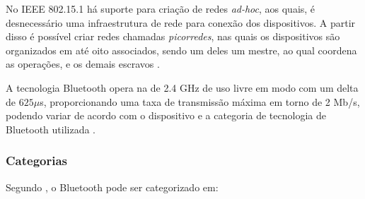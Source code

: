 
No IEEE 802.15.1 há suporte para criação de redes \textit{ad-hoc}, aos quais, é desnecessário uma infraestrutura de rede para conexão dos dispositivos. A partir disso é possível criar redes chamadas \textit{picorredes}, nas quais os dispositivos são organizados em até oito associados, sendo um deles um mestre, ao qual coordena as operações, e os demais escravos \cite{BluetoothSIG2017}.

A tecnologia Bluetooth opera na  de 2.4 GHz de uso livre em modo  com um delta de $625\mu$s, proporcionando uma taxa de transmissão máxima em torno de 2 Mb/s, podendo variar de acordo com o dispositivo e a categoria de tecnologia de Bluetooth utilizada \cite{BluetoothSIG2017}.


\subsubsection{Categorias}

Segundo \citeauthor{BluetoothSIG2017}, o Bluetooth pode ser categorizado em:

